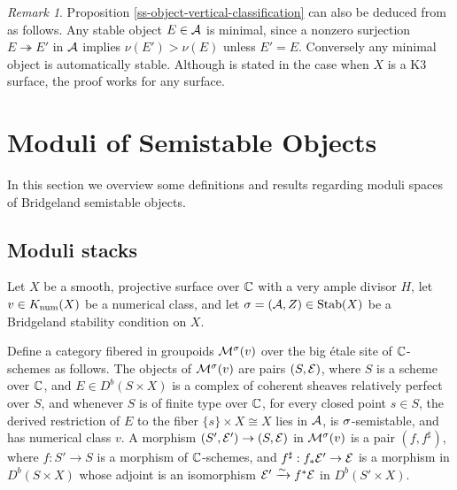 \documentclass[letterpaper,11pt]{amsart}%
\theoremstyle{remark}
\newtheorem{rmk}[thm]{Remark}
\begin{document}
\begin{rmk}
Proposition \ref{ss-object-vertical-classification} can also be deduced from \cite[Proposition 2.2]{huy} as follows. Any stable object $E \in \mathcal{A}$ is minimal, since a nonzero surjection $E \twoheadrightarrow E'$ in $\mathcal{A}$ implies $\nu(E') > \nu(E)$ unless $E' = E$. Conversely any minimal object is automatically stable. Although \cite[Proposition 2.2]{huy} is stated in the case when $X$ is a K3 surface, the proof works for any surface.
\end{rmk}





\section{Moduli of Semistable Objects}
In this section we overview some definitions and results regarding moduli spaces of Bridgeland semistable objects. 

\subsection{Moduli stacks}
Let $X$ be a smooth, projective surface over $\mathbb{C}$ with a very ample divisor $H$, let $v \in K_{\mathrm{num}}(X)$ be a numerical class, and let $\sigma = (\mathcal{A}, Z) \in \operatorname{\mathrm{Stab}}(X)$ be a Bridgeland stability condition on $X$.

Define a category fibered in groupoids $\mathcal{M}^\sigma(v)$ over the big \'etale site of $\mathbb{C}$-schemes as follows. The objects of $\mathcal{M}^\sigma(v)$ are pairs $(S, \mathcal{E})$, where $S$ is a scheme over $\mathbb{C}$, and $E \in D^b(S \times X)$ is a complex of coherent sheaves relatively perfect over $S$, and whenever $S$ is of finite type over $\mathbb{C}$, for every closed point $s \in S$, the derived restriction of $E$ to the fiber $\{s\} \times X \cong X$ lies in $\mathcal{A}$, is $\sigma$-semistable, and has numerical class $v$. A morphism $(S', \mathcal{E}') \to (S, \mathcal{E})$ in $\mathcal{M}^\sigma(v)$ is a pair $(f, f^\sharp)$, where $f: S' \to S$ is a morphism of $\mathbb{C}$-schemes, and $f^\sharp: f_* \mathcal{E}' \to \mathcal{E}$ is a morphism in $D^b(S \times X)$ whose adjoint is an isomorphism $\mathcal{E}' \xrightarrow{\sim} f^* \mathcal{E}$ in $D^b(S' \times X)$.
\end{document}
